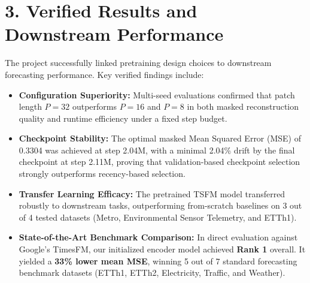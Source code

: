 \documentclass[11pt,a4paper]{article}
\begin{document}
\section*{3. Verified Results and Downstream Performance}
The project successfully linked pretraining design choices to downstream forecasting performance. Key verified findings include:
\begin{itemize}
    \item \textbf{Configuration Superiority:} Multi-seed evaluations confirmed that patch length $P=32$ outperforms $P=16$ and $P=8$ in both masked reconstruction quality and runtime efficiency under a fixed step budget.
    \item \textbf{Checkpoint Stability:} The optimal masked Mean Squared Error (MSE) of 0.3304 was achieved at step 2.04M, with a minimal 2.04\% drift by the final checkpoint at step 2.11M, proving that validation-based checkpoint selection strongly outperforms recency-based selection.
    \item \textbf{Transfer Learning Efficacy:} The pretrained TSFM model transferred robustly to downstream tasks, outperforming from-scratch baselines on 3 out of 4 tested datasets (Metro, Environmental Sensor Telemetry, and ETTh1).
    \item \textbf{State-of-the-Art Benchmark Comparison:} In direct evaluation against Google's TimesFM, our initialized encoder model achieved \textbf{Rank 1} overall. It yielded a \textbf{33\% lower mean MSE}, winning 5 out of 7 standard forecasting benchmark datasets (ETTh1, ETTh2, Electricity, Traffic, and Weather).
\end{itemize}
\end{document}
